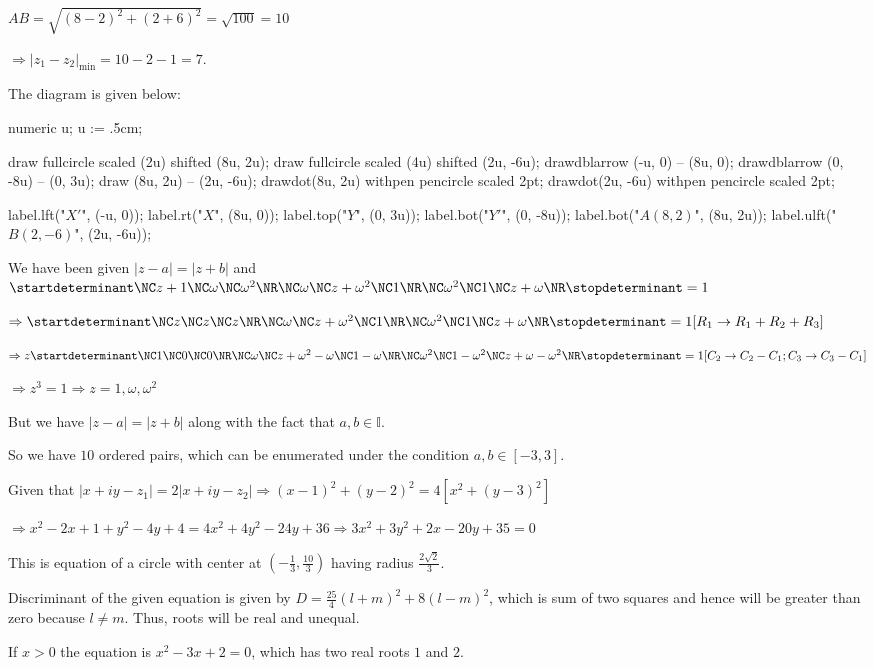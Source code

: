   $AB = \sqrt{(8 - 2)^2 + (2 + 6)^2} = \sqrt{100} = 10$

  $\Rightarrow |z_1 - z_2|_{\min} = 10 - 2 - 1 = 7$.

  The diagram is given below:

  \startplacefigure[location=force]
    \startMPcode
      numeric u;
      u := .5cm;

      draw fullcircle scaled (2u) shifted (8u, 2u);
      draw fullcircle scaled (4u) shifted (2u, -6u);
      drawdblarrow (-u, 0) -- (8u, 0);
      drawdblarrow (0, -8u) -- (0, 3u);
      draw (8u, 2u) -- (2u, -6u);
      drawdot(8u, 2u) withpen pencircle scaled 2pt;
      drawdot(2u, -6u) withpen pencircle scaled 2pt;

      label.lft("$X'$", (-u, 0));
      label.rt("$X$", (8u, 0));
      label.top("$Y$", (0, 3u));
      label.bot("$Y'$", (0, -8u));
      label.bot("$A(8, 2)$", (8u, 2u));
      label.ulft("$B(2, -6)$", (2u, -6u));
    \stopMPcode
  \stopplacefigure
\item We have been given $|z - a| = |z + b|$ and $\startdeterminant\NC z +
  1\NC \omega\NC \omega^2 \NR\NC \omega\NC z + \omega^2 \NC 1\NR\NC \omega^2\NC 1\NC z
  + \omega\NR\stopdeterminant = 1$

  $\Rightarrow \startdeterminant\NC z \NC z\NC z \NR\NC \omega\NC z + \omega^2 \NC 1\NR\NC \omega^2\NC 1\NC
  z + \omega\NR\stopdeterminant = 1[R_1\rightarrow R_1 + R_2 + R_3]$

  $\Rightarrow z\startdeterminant\NC 1\NC 0\NC 0\NR\NC \omega\NC z + \omega^2 - \omega\NC 1
  - \omega\NR\NC \omega^2 \NC 1 - \omega^2\NC z + \omega -\omega^2\NR\stopdeterminant = 1[C_2\rightarrow C_2
    - C_1; C_3\rightarrow C_3 - C_1]$

  $\Rightarrow z^3 = 1 \Rightarrow z = 1, \omega, \omega^2$

  But we have $|z - a| = |z + b|$ along with the fact that $a, b\in\mathbb{I}$.

  So we have $10$ ordered pairs, which can be enumerated under the condition $a,b\in[-3, 3]$.
\item Given that $ |x + iy - z_1| = 2|x + iy - z_2| \Rightarrow (x - 1)^2 + (y - 2)^2 = 4 [x^2 + (y - 3)^2]$

  $\Rightarrow x^2 - 2x + 1 + y^2 - 4y + 4 = 4x^2 + 4y^2 - 24y + 36 \Rightarrow 3x^2 + 3y^2 + 2x - 20y + 35
  = 0$

  This is equation of a circle with center at $\left(-\frac{1}{3}, \frac{10}{3}\right)$ having radius
  $\frac{2\sqrt{2}}{3}$.
\item Discriminant of the given equation is given by $D = \frac{25}{4}(l + m)^2 + 8(l - m)^2$, which is sum
  of two squares and hence will be greater than zero because $l\neq m$. Thus, roots will be real and
  unequal.
\item If $x > 0$ the equation is $x^2 - 3x + 2 = 0$, which has two real roots $1$ and $2$.


